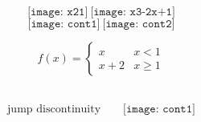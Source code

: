 \documentclass{beamer}
\begin{document}
\begin{frame}
\begin{center}
{\bf \color{blue}{Continuity}}
\end{center}
\end{frame}


\begin{frame}
$$
\texttt{[image: x21]}~	\texttt{[image: x3-2x+1]}$$
$$
\texttt{[image: cont1]}~	\texttt{[image: cont2]}$$
\end{frame}

\begin{frame}{
	$$f(x)=\begin{cases}
x & x<1\\
x+2 & x\geq 1
\end{cases}$$}~~
\begin{mdframed}
	$$\text{jump discontinuity}\quad \quad 
	\texttt{[image: cont1]}
	$$~~
\end{mdframed}
\end{frame}

\end{document}
